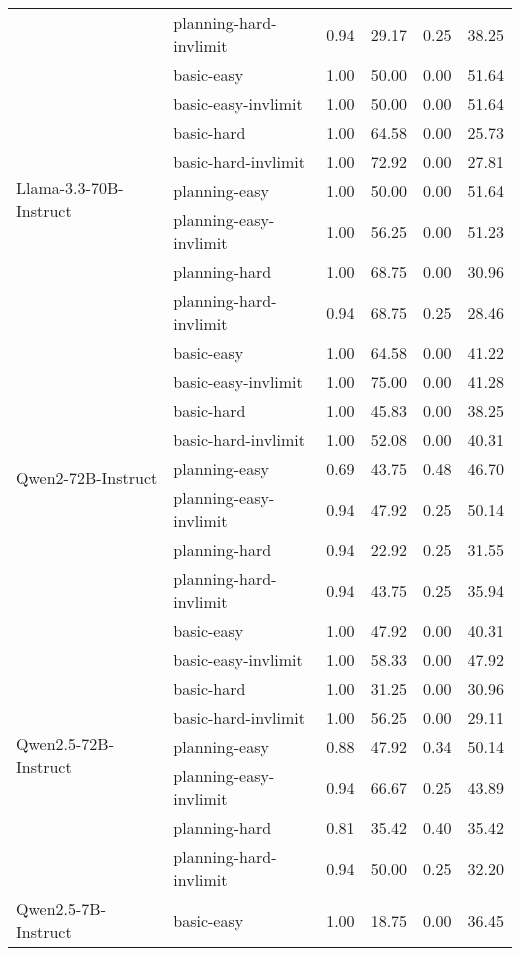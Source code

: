 \begin{tabular}{llrrrr}
 & planning-hard-invlimit & 0.94 & 29.17 & 0.25 & 38.25 \\
\cline{1-6}
\multirow[c]{8}{*}{Llama-3.3-70B-Instruct} & basic-easy & 1.00 & 50.00 & 0.00 & 51.64 \\
 & basic-easy-invlimit & 1.00 & 50.00 & 0.00 & 51.64 \\
 & basic-hard & 1.00 & 64.58 & 0.00 & 25.73 \\
 & basic-hard-invlimit & 1.00 & 72.92 & 0.00 & 27.81 \\
 & planning-easy & 1.00 & 50.00 & 0.00 & 51.64 \\
 & planning-easy-invlimit & 1.00 & 56.25 & 0.00 & 51.23 \\
 & planning-hard & 1.00 & 68.75 & 0.00 & 30.96 \\
 & planning-hard-invlimit & 0.94 & 68.75 & 0.25 & 28.46 \\
\cline{1-6}
\multirow[c]{8}{*}{Qwen2-72B-Instruct} & basic-easy & 1.00 & 64.58 & 0.00 & 41.22 \\
 & basic-easy-invlimit & 1.00 & 75.00 & 0.00 & 41.28 \\
 & basic-hard & 1.00 & 45.83 & 0.00 & 38.25 \\
 & basic-hard-invlimit & 1.00 & 52.08 & 0.00 & 40.31 \\
 & planning-easy & 0.69 & 43.75 & 0.48 & 46.70 \\
 & planning-easy-invlimit & 0.94 & 47.92 & 0.25 & 50.14 \\
 & planning-hard & 0.94 & 22.92 & 0.25 & 31.55 \\
 & planning-hard-invlimit & 0.94 & 43.75 & 0.25 & 35.94 \\
\cline{1-6}
\multirow[c]{8}{*}{Qwen2.5-72B-Instruct} & basic-easy & 1.00 & 47.92 & 0.00 & 40.31 \\
 & basic-easy-invlimit & 1.00 & 58.33 & 0.00 & 47.92 \\
 & basic-hard & 1.00 & 31.25 & 0.00 & 30.96 \\
 & basic-hard-invlimit & 1.00 & 56.25 & 0.00 & 29.11 \\
 & planning-easy & 0.88 & 47.92 & 0.34 & 50.14 \\
 & planning-easy-invlimit & 0.94 & 66.67 & 0.25 & 43.89 \\
 & planning-hard & 0.81 & 35.42 & 0.40 & 35.42 \\
 & planning-hard-invlimit & 0.94 & 50.00 & 0.25 & 32.20 \\
\cline{1-6}
\multirow[c]{8}{*}{Qwen2.5-7B-Instruct} & basic-easy & 1.00 & 18.75 & 0.00 & 36.45 \\

\end{tabular}
